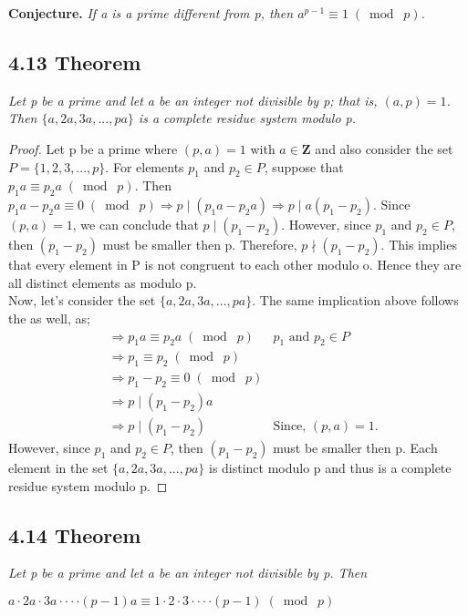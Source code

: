 \documentclass{article}
\begin{document}
\textbf{Conjecture.} \textit{If a is a prime different from p, then $a^{p-1} \equiv 1 \;(\bmod\; p)$.}

\subsection*{4.13 Theorem} 
\quad \textit{Let p be a prime and let a be an integer not divisible by p; that is, $(a, p) = 1$. Then $\{a,2a,3a,...,pa\}$ is a complete residue system modulo p.}

\begin{proof}
Let p be a prime where $(p, a) = 1$ with $a \in \mathbf{Z}$ and also consider the set $P = \{1,2,3,...,p\}$. For elements $p_1$ and $p_2 \in P$, suppose that $p_1a \equiv p_2a \;(\bmod\; p)$. Then $p_1a - p_2a  \equiv 0 \;(\bmod\; p) \Longrightarrow p \mid (p_1a - p_2a) \Longrightarrow p \mid a(p_1 - p_2)$. Since $(p, a) = 1$, we can conclude that $p \mid (p_1 - p_2)$. However, since $p_1$ and $p_2 \in P$, then $(p_1 - p_2)$ must be smaller then p. Therefore, $p \nmid (p_1 - p_2)$. This implies that every element in P is not congruent to each other modulo o. Hence they are all distinct elements as modulo p.\\

Now, let's consider the set $\{a,2a,3a,...,pa\}$. The same implication above follows the as well, as;
\begin{align*}
    &\Longrightarrow p_1a \equiv p_2a \;(\bmod\; p)& \text{$p_1$ and $p_2 \in P$}\\
    &\Longrightarrow p_1 \equiv p_2 \;(\bmod\; p)&\\
    &\Longrightarrow p_1 - p_2 \equiv 0 \;(\bmod\; p)&\\
    &\Longrightarrow p \mid (p_1 - p_2)a&\\
    &\Longrightarrow p \mid (p_1 - p_2)& \text{Since, $(p, a) = 1$}.
\end{align*}
However, since $p_1$ and $p_2 \in P$, then $(p_1 - p_2)$ must be smaller then p. Each element in the set $\{a,2a,3a,...,pa\}$ is distinct modulo p and thus is a complete residue system modulo p.
\end{proof}

\subsection*{4.14 Theorem} 
\quad \textit{Let p be a prime and let a be an integer not divisible by p. Then}
\begin{center}
    $a \cdot 2a \cdot 3a \cdot \cdot \cdot \cdot (p-1)a \equiv 1 \cdot 2 \cdot 3 \cdot \cdot \cdot \cdot (p-1) \;(\bmod\; p)$
\end{center}
\end{document}
